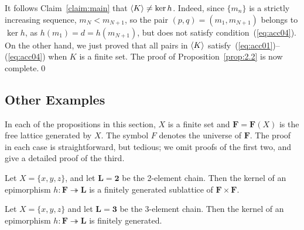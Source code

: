 It follows Claim~\ref{claim:main} that 
$\langle K\rangle \neq \ker h$. Indeed, since $\{m_n\}$ is a strictly increasing sequence, 
$m_N < m_{N+1}$, so the pair $(p, q) = (m_1, m_{N+1})$ belongs to $\ker h$, as 
$h(m_1) = d = h(m_{N+1})$, but does not satisfy condition~(\ref{eq:acc04}). On 
the other hand, we just proved that all pairs in $\langle K\rangle$ 
satisfy~(\ref{eq:acc01})--(\ref{eq:acc04}) when $K$ is a finite set.   The 
proof of Proposition~\ref{prop:2.2} is now complete.\qed




\subsection{Other Examples}
In each of the propositions in this section, $X$ is a finite set and 
$\mathbf{F} = \mathbf{F}(X)$ is the free lattice generated by $X$.
The symbol $F$ denotes the universe of $\mathbf{F}$.  
The proof in each case is straightforward, but tedious;
we omit proofs of the first two, and give a detailed proof of the third.
\begin{prop}\label{prop:1}
Let $X = \{x,y,z\}$, and let $\mathbf{L} = \mathbf{2}$ be the 2-element chain.    
Then the kernel of an epimorphism $h\colon \mathbf{F} \twoheadrightarrow \mathbf{L}$ 
is a finitely generated sublattice of $\mathbf{F} \times \mathbf{F}$.
\end{prop}

\begin{prop}\label{prop:2} 
Let $X = \{x, y, z\}$ and let $\mathbf{L} = \mathbf{3}$ be the 3-element chain.    
Then the kernel of an epimorphism $h\colon \mathbf{F} \twoheadrightarrow \mathbf{L}$ 
is finitely generated.
\end{prop}

